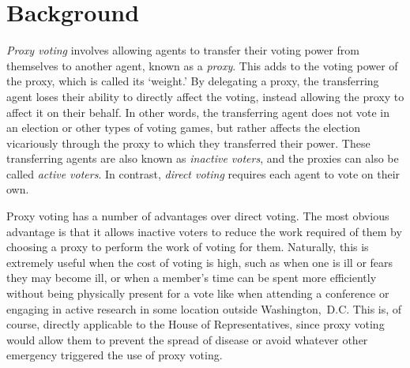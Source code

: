 %


\section{Background}\label{sec:background}
\textit{Proxy voting} involves allowing agents to transfer their voting power
from themselves to another agent, known as a \textit{proxy}.
This adds to the voting power of the proxy, which is called its `weight.'
By delegating a proxy, the transferring agent loses their ability to directly affect the
voting, instead allowing the proxy to affect it on their behalf.
In other words, the transferring agent does not vote in an election or other types of
voting games, but rather affects the election vicariously through the proxy to which
they transferred their power.
These transferring agents are also known as \textit{inactive voters}, and the
proxies can also be called \textit{active voters}.
In contrast, \textit{direct voting} requires each agent to vote on their own.

Proxy voting has a number of advantages over direct voting.
The most obvious advantage is that it allows inactive voters to reduce the work
required of them by choosing a proxy to perform the work of voting for them.
Naturally, this is extremely useful when the cost of voting is high, such as
when one is ill or fears they may become ill, or when a member's time can be spent
more efficiently without being physically present for a vote like when attending a
conference or engaging in active research in some location outside {Washington,~D.C.}
This is, of course, directly applicable to the House of Representatives, since proxy
voting would allow them to prevent the spread of disease or avoid whatever other
emergency triggered the use of proxy voting.  

